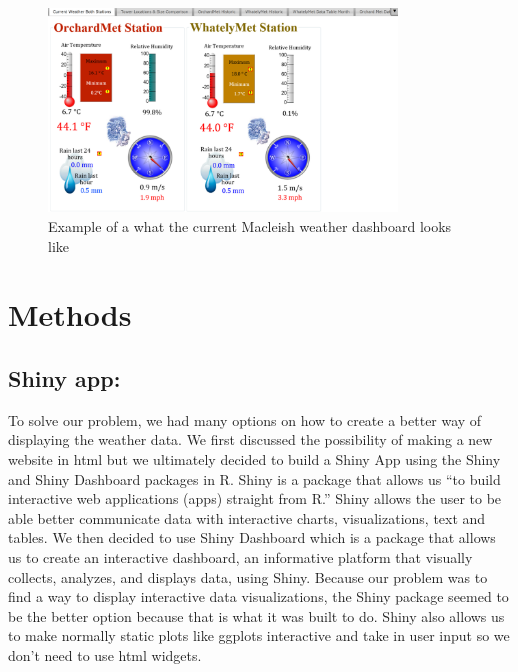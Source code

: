 \documentclass[10pt,letterpaper]{article}
\begin{document}
\begin{figure}
\includegraphics[width=350px]{current} \caption{Example of a what the current Macleish weather dashboard looks like}\label{fig:unnamed-chunk-1}
\end{figure}

\section{Methods}\label{methods}

\subsection{Shiny app:}\label{shiny-app}

To solve our problem, we had many options on how to create a better way
of displaying the weather data. We first discussed the possibility of
making a new website in html but we ultimately decided to build a Shiny
App using the Shiny and Shiny Dashboard packages in R. Shiny is a
package that allows us ``to build interactive web applications (apps)
straight from R.'' Shiny allows the user to be able better communicate
data with interactive charts, visualizations, text and tables. We then
decided to use Shiny Dashboard which is a package that allows us to
create an interactive dashboard, an informative platform that visually
collects, analyzes, and displays data, using Shiny. Because our problem
was to find a way to display interactive data visualizations, the Shiny
package seemed to be the better option because that is what it was built
to do. Shiny also allows us to make normally static plots like ggplots
interactive and take in user input so we don't need to use html widgets.
\end{document}

